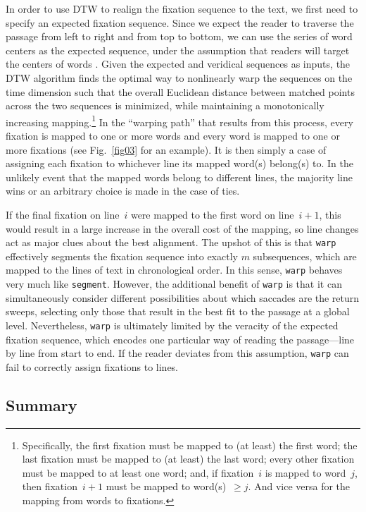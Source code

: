 \documentclass[doc,biblatex]{apa7}
\begin{document}
In order to use DTW to realign the fixation sequence to the text, we first need to specify an expected fixation sequence. Since we expect the reader to traverse the passage from left to right and from top to bottom, we can use the series of word centers as the expected sequence, under the assumption that readers will target the centers of words \parencite{ORegan:1984}. Given the expected and veridical sequences as inputs, the DTW algorithm finds the optimal way to nonlinearly warp the sequences on the time dimension such that the overall Euclidean distance between matched points across the two sequences is minimized, while maintaining a monotonically increasing mapping.\footnote{Specifically, the first fixation must be mapped to (at least) the first word; the last fixation must be mapped to (at least) the last word; every other fixation must be mapped to at least one word; and, if fixation~$i$ is mapped to word~$j$, then fixation~$i+1$ must be mapped to word(s)~$\ge j$. And vice versa for the mapping from words to fixations.} In the ``warping path'' that results from this process, every fixation is mapped to one or more words and every word is mapped to one or more fixations (see Fig.~\ref{fig03} for an example). It is then simply a case of assigning each fixation to whichever line its mapped word(s) belong(s) to. In the unlikely event that the mapped words belong to different lines, the majority line wins or an arbitrary choice is made in the case of ties.

If the final fixation on line~$i$ were mapped to the first word on line~$i+1$, this would result in a large increase in the overall cost of the mapping, so line changes act as major clues about the best alignment. The upshot of this is that \texttt{warp} effectively segments the fixation sequence into exactly $m$ subsequences, which are mapped to the lines of text in chronological order. In this sense, \texttt{warp} behaves very much like \texttt{segment}. However, the additional benefit of \texttt{warp} is that it can simultaneously consider different possibilities about which saccades are the return sweeps, selecting only those that result in the best fit to the passage at a global level. Nevertheless, \texttt{warp} is ultimately limited by the veracity of the expected fixation sequence, which encodes one particular way of reading the passage---line by line from start to end. If the reader deviates from this assumption, \texttt{warp} can fail to correctly assign fixations to lines.

\subsection{Summary}
\end{document}
